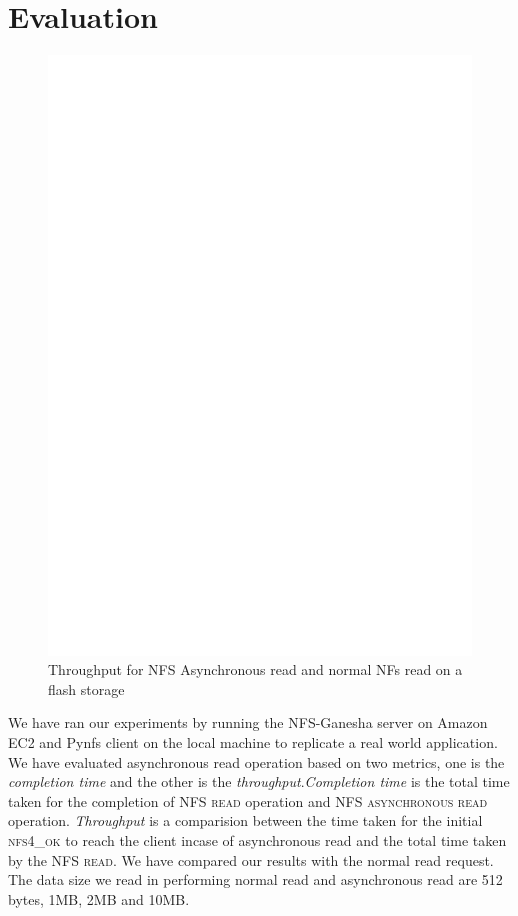 \section{Evaluation}
\label{sec:Evaluation}

\begin{figure}
\centering
\includegraphics[scale=0.6]{figures/performancesequence.eps}
\caption{Throughput for NFS Asynchronous read and normal NFs read on a flash storage}
\label{fig:performancesequence}
\end{figure}

	We have ran our experiments by running the NFS-Ganesha server on Amazon EC2 and Pynfs client on the local machine to replicate a real world application.  We have evaluated asynchronous read operation based on two metrics, one is the \textit{completion time} and the other is the \textit{throughput}.\textit{Completion time} is the total time taken for the completion of \textsc{NFS read} operation and \textsc{NFS asynchronous read} operation. \textit{Throughput} is a comparision between the time taken for the initial \textsc{nfs4\_ok} to reach the client incase of asynchronous read and the total time taken by the \textsc{NFS read}. We have compared our results with the normal read request. The data size we read in performing normal read and asynchronous read are 512 bytes, 1MB, 2MB and 10MB. 


